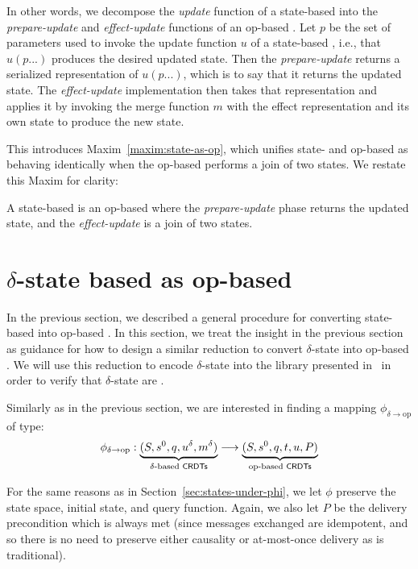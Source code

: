 In other words, we decompose the \textit{update} function of a state-based \CRDT
into the \textit{prepare-update} and \textit{effect-update} functions of an
op-based \CRDT. Let $p$ be the set of parameters used to invoke the update
function $u$ of a state-based \CRDT, i.e., that $u(p...)$ produces the desired
updated state. Then the \textit{prepare-update} returns a serialized
representation of $u(p...)$, which is to say that it returns the updated state.
The \textit{effect-update} implementation then takes that representation and
applies it by invoking the merge function $m$ with the effect representation and
its own state to produce the new state.

This introduces Maxim~\ref{maxim:state-as-op}, which unifies state- and op-based
\CRDTs as behaving identically when the op-based \CRDT performs a join of two
states. We restate this Maxim for clarity:

\setcounter{maxim}{0}
\begin{maxim}
  A state-based \CRDT is an op-based \CRDT where the \emph{prepare-update} phase
  returns the updated state, and the \emph{effect-update} is a join of two
  states.
\end{maxim}

\section{$\delta$-state based \CRDTs as op-based}
\label{sec:delta-as-op}

In the previous section, we described a general procedure for converting
state-based \CRDTs into op-based \CRDTs. In this section, we treat the insight
in the previous section as guidance for how to design a similar reduction to
convert $\delta$-state \CRDTs into op-based \CRDTs. We will use this reduction
to encode $\delta$-state \CRDTs into the library presented in~\citet{gomes17} in
order to verify that $\delta$-state \CRDTs are \SEC.

Similarly as in the previous section, we are interested in finding a mapping
$\phi_{\delta \to \text{op}}$ of type:
\[
  \phi_{\delta \to \text{op}} :
    \underbrace{(S, s^0, q, u^\delta, m^\delta)}_{\text{$\delta$-based \textsf{CRDTs}}}
    \longrightarrow
    \underbrace{(S, s^0, q, t, u, P)}_{\text{op-based \textsf{CRDTs}}}
\]

For the same reasons as in Section~\ref{sec:states-under-phi}, we let $\phi$
preserve the state space, initial state, and query function. Again, we also let
$P$ be the delivery precondition which is always met (since messages exchanged
are idempotent, and so there is no need to preserve either causality or
at-most-once delivery as is traditional).

